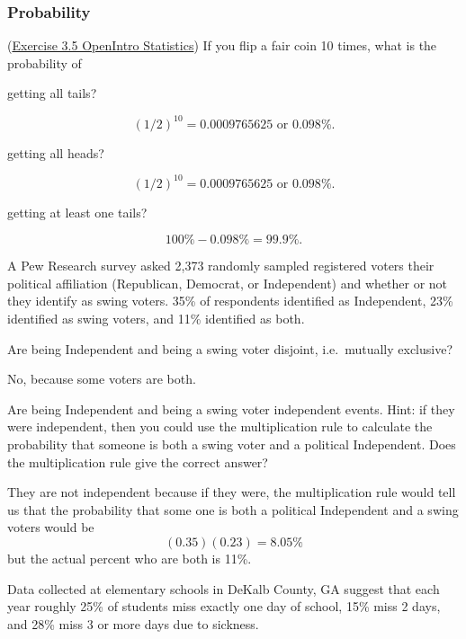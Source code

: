 \documentclass[12pt,answers]{exam}
\newcounter{countA}
\begin{document}
\subsubsection*{Probability}\label{probability}
\begin{questions}
\setcounter{question}{\value{countA}}
\question (\href{https://people.hsc.edu/faculty-staff/blins/books/OpenIntroStats4e.pdf#eoce.3.5}{Exercise 3.5 OpenIntro Statistics})
  If you flip a fair coin 10 times, what is the probability of

  \begin{parts}
  \item
    getting all tails?
\begin{solution}
$$(1/2)^{10} = 0.0009765625 \text{ or } 0.098 \%.$$
\end{solution}
\vfill
  \item
    getting all heads?
\begin{solution}
$$(1/2)^{10} = 0.0009765625 \text{ or } 0.098 \%.$$
\end{solution}
\vfill
  \item
    getting at least one tails?
\begin{solution}
$$100\% - 0.098 \% = 99.9\%.$$
\end{solution}
\vfill
  \end{parts}
\question
  A Pew Research survey asked 2,373 randomly sampled registered voters
  their political affiliation (Republican, Democrat, or Independent) and
  whether or not they identify as swing voters. 35\% of respondents
  identified as Independent, 23\% identified as swing voters, and 11\%
  identified as both.

  \begin{parts}
  \item
    Are being Independent and being a swing voter disjoint,
    i.e.~mutually exclusive?
\begin{solution}
No, because some voters are both.
\end{solution}
\vfill
  \item
    Are being Independent and being a swing voter independent events.
    Hint: if they were independent, then you could use the
    multiplication rule to calculate the probability that someone is
    both a swing voter and a political Independent. Does the
    multiplication rule give the correct answer?
\begin{solution}
They are not independent because if they were, the multiplication rule would tell us that the probability that some one is both a political Independent and a swing voters would be 
$$(0.35)(0.23) = 8.05\%$$
but the actual percent who are both is 11\%.  
\end{solution}
\vfill
  \end{parts}
\question
  Data collected at elementary schools in DeKalb County, GA suggest that
  each year roughly 25\% of students miss exactly one day of school,
  15\% miss 2 days, and 28\% miss 3 or more days due to sickness.


\end{questions}
\end{document}
